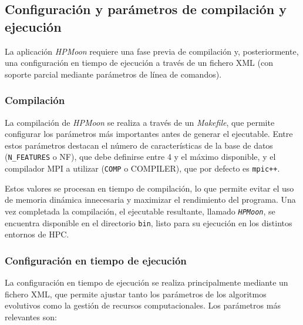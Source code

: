\subsection{Configuración y parámetros de compilación y ejecución}\label{subsec:hpm_configuracion}

La aplicación \textit{HPMoon} requiere una fase previa de compilación y, posteriormente, una configuración en tiempo de ejecución a través de un fichero XML (con soporte parcial mediante parámetros de línea de comandos).

\subsubsection{Compilación}

La compilación de \textit{HPMoon} se realiza a través de un \textit{Makefile}, que permite configurar los parámetros más importantes antes de generar el ejecutable. Entre estos parámetros destacan el número de características de la base de datos (\texttt{N\_FEATURES} o NF), que debe definirse entre 4 y el máximo disponible, y el compilador MPI a utilizar (\texttt{COMP} o COMPILER), que por defecto es \texttt{mpic++}.

Estos valores se procesan en tiempo de compilación, lo que permite evitar el uso de memoria dinámica innecesaria y maximizar el rendimiento del programa. Una vez completada la compilación, el ejecutable resultante, llamado \texttt{\textit{HPMoon}}, se encuentra disponible en el directorio \texttt{bin}, listo para su ejecución en los distintos entornos de HPC.

\subsubsection{Configuración en tiempo de ejecución}

La configuración en tiempo de ejecución se realiza principalmente mediante un fichero XML, que permite ajustar tanto los parámetros de los algoritmos evolutivos como la gestión de recursos computacionales. Los parámetros más relevantes son:

